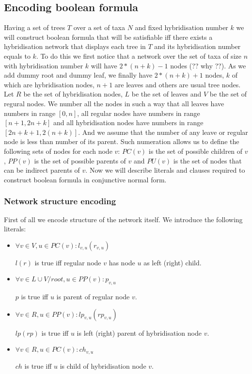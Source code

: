 \documentclass[runningheads, envcountsame, a4paper]{llncs}
\begin{document}
\subsection{Encoding boolean formula}

Having a set of trees $T$ over a set of taxa $N$ and fixed hybridisation number $k$ we will construct boolean formula that will be satisfiable iff there exists a hybridisation network that displays each tree in $T$ and its hybridisation number equals to $k$. To do this we first notice that a network over the set of taxa of size $n$ with hybridisation number $k$ will have $2 * (n + k) - 1$ nodes (?? why ??). As we add dummy root and dummy leaf, we finally have $2 * (n + k) + 1$ nodes, $k$ of which are hybridisation nodes, $n + 1$ are leaves and others are usual tree nodes. Let $R$ be the set of hybridisation nodes, $L$ be the set of leaves and $V$ be the set of regural nodes. We number all the nodes in such a way that all leaves have numbers in range $[0,n]$, all regular nodes have numbers in range $[n + 1,2n + k]$ and all hybridisation nodes have numbers in range $[2n + k + 1, 2(n + k)]$. And we assume that the number of any leave or regular node is less than number of its parent. Such numeration allows us to define the following sets of nodes for each node $v$: $PC(v)$ is the set of possible children of $v$, $PP(v)$ is the set of possible parents of $v$ and $PU(v)$ is the set of nodes that can be indirect parents of $v$. Now we will describe literals and clauses required to construct boolean formula in conjunctive normal form.

\subsubsection{Network structure encoding}

First of all we encode structure of the network itself. We introduce the following literals: 

\begin{itemize}

\item $\forall v \in V, u \in PC(v) : l_{v,u}(r_{v,u})$ 

$l (r)$ is true iff regular node $v$ has node $u$ as left (right) child.

\item $\forall v \in L \cup V / root, u \in PP(v) : p_{v,u}$ 

$p$ is true iff $u$ is parent of regular node $v$.

\item $\forall v \in R, u \in PP(v) : lp_{v,u}(rp_{v,u})$ 

$lp (rp)$ is true iff $u$ is left (right) parent of hybridisation node $v$.

\item $\forall v \in R, u \in PC(v) : ch_{v,u}$ 

$ch$ is true iff $u$ is child of hybridisation node $v$.

\end{itemize}
\end{document}
